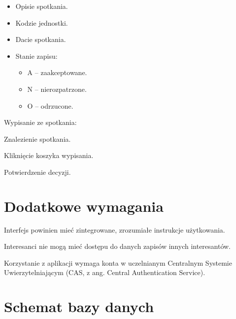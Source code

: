 \documentclass[licencjacka]{pracamgr}
\begin{document}
\begin{step}
\begin{step}
\begin{itemize}
							\item Opisie spotkania.
							\item Kodzie jednostki.
							\item Dacie spotkania.
							\item Stanie zapisu:
								\begin{itemize}
									\item A -- zaakceptowane.
									\item N -- nierozpatrzone.
									\item O -- odrzucone.
								\end{itemize}
						\end{itemize}
				\end{step}
			\item Wypisanie ze spotkania:
				\begin{step}
					\item Znalezienie spotkania.
					\item Kliknięcie koszyka wypisania.
					\item Potwierdzenie decyzji.
				\end{step}
	\end{step}
	

\section{Dodatkowe wymagania}
	\begin{step}
		\item Interfejs powinien mieć zintegrowane, zrozumiałe instrukcje użytkowania.
		\item Interesanci nie mogą mieć dostępu do danych zapisów innych interesantów.
		\item Korzystanie z aplikacji wymaga konta w uczelnianym Centralnym Systemie Uwierzytelniającym (CAS, z ang. Central Authentication Service).
	\end{step}
	
\section{Schemat bazy danych}
\end{document}
